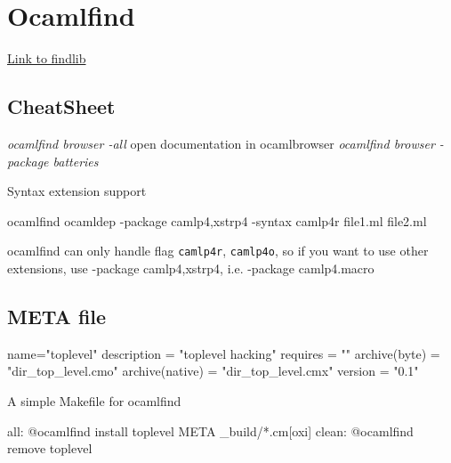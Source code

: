 \section{Ocamlfind}

\href{http://projects.camlcity.org/projects/dl/findlib-1.2.3/doc/ref-html/r17.html}{Link  to findlib}

\subsection{CheatSheet}

\begin{bashcode}
\emph{ocamlfind browser -all } open documentation in ocamlbrowser 
\emph{ocamlfind browser -package batteries}
\end{bashcode}

Syntax extension support  

\begin{bashcode}
ocamlfind ocamldep -package camlp4,xstrp4 -syntax camlp4r file1.ml file2.ml 
\end{bashcode}
ocamlfind can only handle flag \verb|camlp4r|, \verb|camlp4o|, so if
you want to use other extensions, use -package camlp4,xstrp4,
i.e. -package camlp4.macro
  


\subsection{META file}

\begin{bashcode}
name="toplevel"
description = "toplevel hacking"
requires = ""
archive(byte) = "dir_top_level.cmo"
archive(native) = "dir_top_level.cmx"
version = "0.1"
\end{bashcode}


A simple Makefile for ocamlfind 

\begin{bashcode}
all:
	   @ocamlfind install toplevel META _build/*.cm[oxi]
clean: 
	   @ocamlfind remove toplevel 
\end{bashcode}

